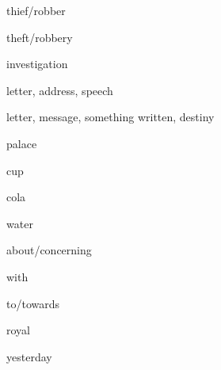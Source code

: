 

\begin{flashcard}{\LARGE thief/robber}
\LARGE {}
\end{flashcard}
\begin{flashcard}{\LARGE theft/robbery}
\LARGE {}
\end{flashcard}
\begin{flashcard}{\LARGE investigation}
\LARGE {}
\end{flashcard}
\begin{flashcard}{\LARGE letter, address, speech}
\LARGE {}
\end{flashcard}
\begin{flashcard}{\LARGE letter, message, something written, destiny}
\LARGE {}
\end{flashcard}
\begin{flashcard}{\LARGE palace}
\LARGE {}
\end{flashcard}
\begin{flashcard}{\LARGE cup}
\LARGE {}
\end{flashcard}
\begin{flashcard}{\LARGE cola}
\LARGE {}
\end{flashcard}
\begin{flashcard}{\LARGE water}
\LARGE {}
\end{flashcard}
\begin{flashcard}{\LARGE about/concerning}
\LARGE {}
\end{flashcard}
\begin{flashcard}{\LARGE with}
\LARGE {}
\end{flashcard}
\begin{flashcard}{\LARGE to/towards}
\LARGE {}
\end{flashcard}
\begin{flashcard}{\LARGE royal}
\LARGE {}
\end{flashcard}
\begin{flashcard}{\LARGE yesterday}
\LARGE {}
\end{flashcard}
